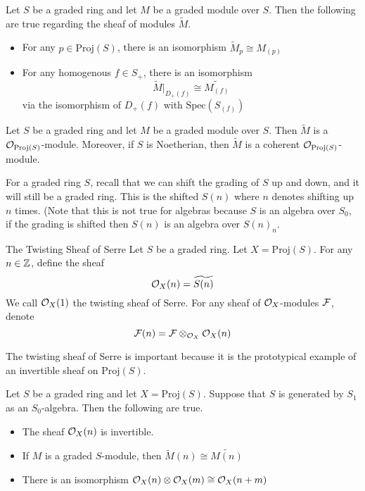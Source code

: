\documentclass[a4paper]{article}
\begin{document}
\begin{prp}{}{} Let $S$ be a graded ring and let $M$ be a graded module over $S$. Then the following are true regarding the sheaf of modules $\tilde{M}$. 
\begin{itemize}
\item For any $p\in\text{Proj}(S)$, there is an isomorphism $\tilde{M}_p\cong M_{(p)}$
\item For any homogenous $f\in S_+$, there is an isomorphism $$\tilde{M}|_{D_+(f)}\cong\widetilde{M_{(f)}}$$ via the isomorphism of $D_+(f)$ with $\text{Spec}(S_{(f)})$
\end{itemize}
\end{prp}

\begin{lmm}{}{} Let $S$ be a graded ring and let $M$ be a graded module over $S$. Then $\tilde{M}$ is a $\mathcal{O}_{\text{Proj}(S)}$-module. Moreover, if $S$ is Noetherian, then $\tilde{M}$ is a coherent $\mathcal{O}_{\text{Proj}(S)}$-module. 
\end{lmm}

For a graded ring $S$, recall that we can shift the grading of $S$ up and down, and it will still be a graded ring. This is the shifted $S(n)$ where $n$ denotes shifting up $n$ times. (Note that this is not true for algebras because $S$ is an algebra over $S_0$, if the grading is shifted then $S(n)$ is an algebra over $S(n)_n$. 

\begin{defn}{The Twisting Sheaf of Serre}{} Let $S$ be a graded ring. Let $X=\text{Proj}(S)$. For any $n\in\mathbb{Z}$, define the sheaf $$\mathcal{O}_X(n)=\widetilde{S(n)}$$ We call $\mathcal{O}_X(1)$ the twisting sheaf of Serre. For any sheaf of $\mathcal{O}_X$-modules $\mathcal{F}$, denote $$\mathcal{F}(n)=\mathcal{F}\otimes_{\mathcal{O}_X}\mathcal{O}_X(n)$$
\end{defn}

The twisting sheaf of Serre is important because it is the prototypical example of an invertible sheaf on $\text{Proj}(S)$. 

\begin{prp}{}{} Let $S$ be a graded ring and let $X=\text{Proj}(S)$. Suppose that $S$ is generated by $S_1$ as an $S_0$-algebra. Then the following are true. 
\begin{itemize}
\item The sheaf $\mathcal{O}_X(n)$ is invertible. 
\item If $M$ is a graded $S$-module, then $\widetilde{M}(n)\cong\widetilde{M(n)}$
\item There is an isomorphism $\mathcal{O}_X(n)\otimes\mathcal{O}_X(m)\cong\mathcal{O}_X(n+m)$
\end{itemize}
\end{prp}
\end{document}
